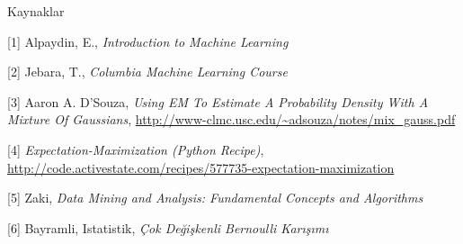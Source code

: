 \documentclass[12pt,fleqn]{article}\usepackage{../../common}
\begin{document}
Kaynaklar

[1] Alpaydin, E., {\em Introduction to Machine Learning}

[2] Jebara, T., {\em Columbia Machine Learning Course}

[3] Aaron A. D'Souza, {\em Using EM To Estimate A Probability Density With A
Mixture Of Gaussians}, \url{http://www-clmc.usc.edu/~adsouza/notes/mix_gauss.pdf}

[4] {\em Expectation-Maximization (Python Recipe)}, \url{http://code.activestate.com/recipes/577735-expectation-maximization}

[5] Zaki, {\em Data Mining and Analysis: Fundamental Concepts and Algorithms}

[6] Bayramli, Istatistik, {\em Çok Değişkenli Bernoulli Karışımı}
\end{document}
